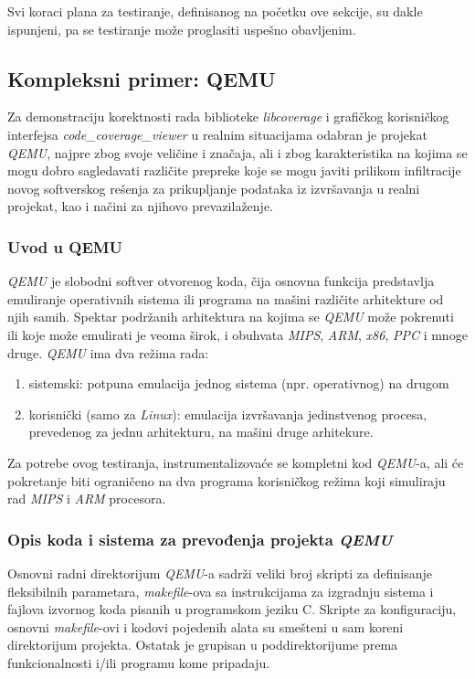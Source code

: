 \documentclass[12pt,oneside]{memoir}
\newcommand{\strano}[1]{\textit{#1}}
\begin{document}
Svi koraci plana za testiranje, definisanog na početku ove sekcije, su dakle ispunjeni, pa se testiranje može proglasiti uspešno obavljenim. 


\subsection{Kompleksni primer: QEMU}

Za demonstraciju korektnosti rada biblioteke \strano{libcoverage} i grafičkog korisničkog interfejsa \strano{code\_coverage\_viewer} u realnim situacijama odabran je projekat \strano{QEMU}, najpre zbog svoje veličine i značaja, ali i zbog karakteristika na kojima se mogu dobro sagledavati različite prepreke koje se mogu javiti prilikom infiltracije novog softverskog rešenja za prikupljanje podataka iz izvršavanja u realni projekat, kao i načini za njihovo prevazilaženje.

\subsubsection{Uvod u QEMU}

\strano{QEMU} \cite{QEMU} je slobodni softver otvorenog koda, čija osnovna funkcija predstavlja emuliranje operativnih sistema ili programa na mašini različite arhitekture od njih samih. Spektar podržanih arhitektura na kojima se \strano{QEMU} može pokrenuti ili koje može emulirati je veoma širok, i obuhvata \strano{MIPS}, \strano{ARM}, \strano{x86}, \strano{PPC} i mnoge druge.
\strano{QEMU} ima dva režima rada:
\begin{enumerate}
\item sistemski: potpuna emulacija jednog sistema (npr. operativnog) na drugom
\item korisnički (samo za \strano{Linux}): emulacija izvršavanja jedinstvenog procesa, prevedenog za jednu arhitekturu, na mašini druge arhitekure.
\end{enumerate}
Za potrebe ovog testiranja, instrumentalizovaće se kompletni kod \strano{QEMU}-a, ali će pokretanje biti ograničeno na dva programa korisničkog režima koji simuliraju rad \strano{MIPS} i \strano{ARM} procesora.

\subsubsection{Opis koda i sistema za prevođenja projekta \strano{QEMU}}

Osnovni radni direktorijum \strano{QEMU}-a sadrži veliki broj skripti za definisanje fleksibilnih parametara, \strano{makefile}-ova sa instrukcijama za izgradnju sistema i fajlova izvornog koda pisanih u programskom jeziku C. Skripte za konfiguraciju, osnovni \strano{makefile}-ovi i kodovi pojedenih alata su smešteni u sam koreni direktorijum projekta. Ostatak je grupisan u poddirektorijume prema funkcionalnosti i/ili programu kome pripadaju.
\end{document}
